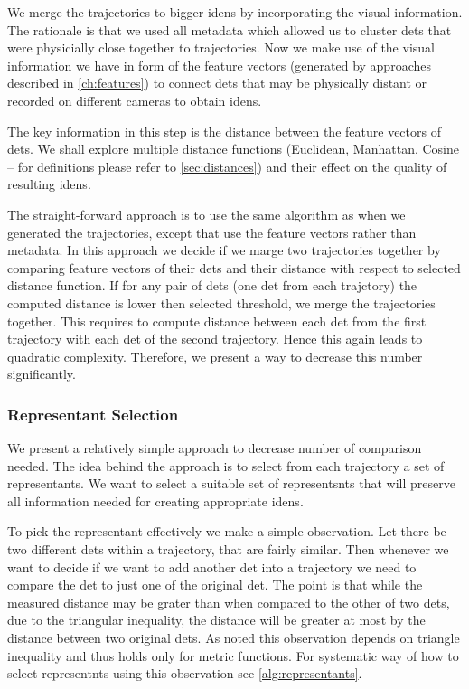 We merge the trajectories to bigger \glspl{iden} by incorporating the visual
information. The rationale is that we used all metadata which allowed us to
cluster \glspl{det} that were physicially close together to trajectories.
Now we make use of the visual information we have in form of the feature vectors
(generated by approaches described in \ref{ch:features}) to connect \glspl{det}
that may be physically distant or recorded on different cameras to obtain
\glspl{iden}.

The key information in this step is the distance between the feature
vectors of \glspl{det}. We shall explore multiple distance functions
(Euclidean, Manhattan, Cosine -- for definitions please refer to
\autoref{sec:distances}) and their effect on the quality of resulting
\glspl{iden}.

The straight-forward approach is to use the same algorithm as when we
generated the trajectories, except that use the feature vectors
rather than metadata. In this approach we decide if we marge two trajectories
together by comparing feature vectors of their \glspl{det} and their distance
with respect to selected distance function. If for any pair of \glspl{det} 
(one \gls{det} from each trajctory) the computed distance is lower then selected
threshold, we merge the trajectories together. This requires to compute distance
between each \gls{det} from the first trajectory with each \gls{det} of the
second trajectory. Hence this again leads to quadratic complexity.
Therefore, we present a way to decrease this number significantly.

\subsubsection{Representant Selection}

We present a relatively simple approach to decrease number of comparison needed.
The idea behind the approach is to select from each trajectory a set of
representants. We want to select a  suitable set of representsnts that will
preserve all information needed for creating appropriate \glspl{iden}.

To pick the representant effectively we make a simple observation. Let there be
two different \glspl{det} within a trajectory, that are fairly similar. Then
whenever we want to decide if we want to add another \gls{det} into a trajectory
we need to compare the \gls{det} to just one of the original \gls{det}. The
point is that while the measured distance may be grater than when compared
to the other of two \glspl{det}, due to the triangular inequality, the distance
will be greater at most by the distance between two original \glspl{det}.
As noted this observation depends on triangle inequality and thus holds only
for metric functions.
For systematic way of how to select representnts using this observation
see \autoref{alg:representants}.

